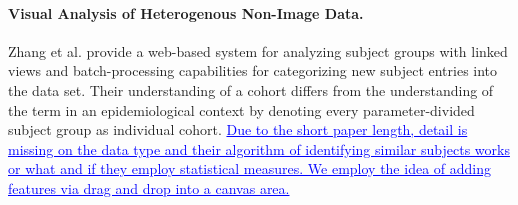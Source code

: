 \documentclass[journal]{style/vgtc} 			          %
\newcommand{\add}[1]{\textcolor{blue}{\uline{#1}}}
\begin{document}
\paragraph{Visual Analysis of Heterogenous Non-Image Data.}
Zhang et al. \cite{Zhang2012} provide a web-based system for analyzing subject groups with linked views and batch-processing capabilities for categorizing new subject entries into the data set.
%
Their understanding of a cohort differs from the understanding of the term in an epidemiological context by denoting every parameter-divided subject group as individual cohort.
%
\add{Due to the short paper length, detail is missing on the data type and their algorithm of identifying similar subjects works or what and if they employ statistical measures.
%
We employ the idea of adding features via drag and drop into a canvas area.}
\end{document}

